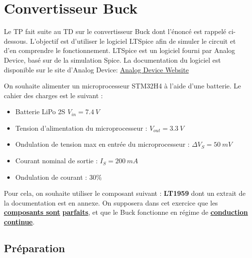 \chapter{Convertisseur Buck}

Le TP fait suite au TD sur le convertisseur Buck dont l'énoncé est rappelé ci-dessous.
L'objectif est d'utiliser le logiciel LTSpice afin de simuler le circuit et d'en comprendre le fonctionnement.
LTSpice est un logiciel fourni par Analog Device, basé sur de la simulation Spice. La documentation du logiciel est disponible sur le site d'Analog Device: \href{https://www.analog.com/en/resources/design-tools-and-calculators/ltspice-simulator/ltspice-recommended-reading-list.html}{Analog Device Website}

On souhaite alimenter un microprocesseur STM32H4 à l'aide d'une batterie. Le cahier des charges est le suivant :

\begin{itemize}
\item Batterie LiPo 2S $V_{in} = 7.4\ V$
\item Tension d'alimentation du microprocesseur : $V_{out}=3.3\ V$
\item Ondulation de tension max en entrée du microprocesseur : $\Delta V_S = 50\ mV$
\item Courant nominal de sortie : $I_S = 200\ mA$
\item Ondulation de courant : 30\%
\end{itemize}

Pour cela, on souhaite utiliser le composant suivant : \textbf{LT1959} dont un extrait de la documentation 
est en annexe.
On supposera dans cet exercice que les \underline{\textbf{composants sont}} 
\underline{\textbf{parfaits}}, et que le Buck fonctionne en régime de \underline{\textbf{conduction continue}}.

\section{Préparation}

